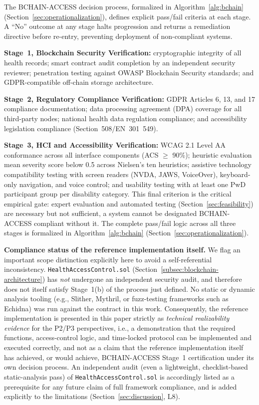 \documentclass[journal,onecolumn]{IEEEtran}
\begin{document}
The BCHAIN-ACCESS decision process, formalized in Algorithm~\ref{alg:bchain} (Section~\ref{sec:operationalization}), defines explicit pass/fail criteria at each stage. A ``No'' outcome at any stage halts progression and returns a remediation directive before re-entry, preventing deployment of non-compliant systems.

\textbf{Stage~1, Blockchain Security Verification:} cryptographic integrity of all health records; smart contract audit completion by an independent security reviewer; penetration testing against OWASP Blockchain Security standards; and GDPR-compatible off-chain storage architecture.

\textbf{Stage~2, Regulatory Compliance Verification:} GDPR Articles 6, 13, and 17 compliance documentation; data processing agreement (DPA) coverage for all third-party nodes; national health data regulation compliance; and accessibility legislation compliance (Section~508/EN~301~549).

\textbf{Stage~3, HCI and Accessibility Verification:} WCAG 2.1 Level AA conformance across all interface components (ACS $\geq$ 90\%); heuristic evaluation mean severity score below 0.5 across Nielsen's ten heuristics; assistive technology compatibility testing with screen readers (NVDA, JAWS, VoiceOver), keyboard-only navigation, and voice control; and usability testing with at least one PwD participant group per disability category. This final criterion is the critical empirical gate: expert evaluation and automated testing (Section~\ref{sec:feasibility}) are necessary but not sufficient, a system cannot be designated BCHAIN-ACCESS compliant without it. The complete pass/fail logic across all three stages is formalized in Algorithm~\ref{alg:bchain} (Section~\ref{sec:operationalization}).

\textbf{Compliance status of the reference implementation itself.} We flag an important scope distinction explicitly here to avoid a self-referential inconsistency. \texttt{HealthAccessControl.sol} (Section~\ref{subsec:blockchain-architecture}) has \emph{not} undergone an independent security audit, and therefore does not itself satisfy Stage~1(b) of the process just defined. No static or dynamic analysis tooling (e.g., Slither, Mythril, or fuzz-testing frameworks such as Echidna) was run against the contract in this work. Consequently, the reference implementation is presented in this paper strictly as \emph{technical realizability evidence} for the P2/P3 perspectives, i.e., a demonstration that the required functions, access-control logic, and time-locked protocol can be implemented and executed correctly, and not as a claim that the reference implementation itself has achieved, or would achieve, BCHAIN-ACCESS Stage~1 certification under its own decision process. An independent audit (even a lightweight, checklist-based static-analysis pass) of \texttt{HealthAccessControl.sol} is accordingly listed as a prerequisite for any future claim of full framework compliance, and is added explicitly to the limitations (Section~\ref{sec:discussion}, L8).
\end{document}
